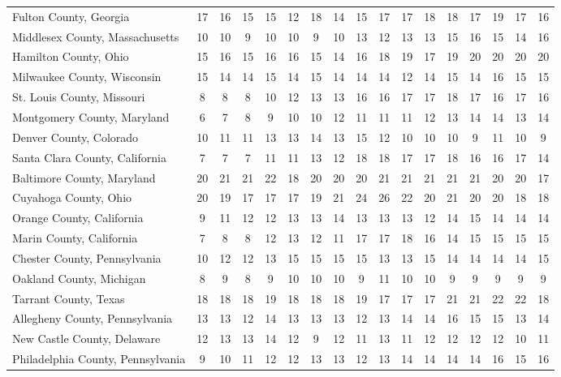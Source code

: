 \begin{landscape}
\begin{longtable}{lcccccccccccccccc}
	Fulton County, Georgia & 17 & 16 & 15 & 15 & 12 & 18 & 14 & 15 & 17 & 17 & 18 & 18 & 17 & 19 & 17 & 16 \\
	Middlesex County, Massachusetts & 10 & 10 & 9 & 10 & 10 & 9 & 10 & 13 & 12 & 13 & 13 & 15 & 16 & 15 & 14 & 16 \\
	Hamilton County, Ohio & 15 & 16 & 15 & 16 & 16 & 15 & 14 & 16 & 18 & 19 & 17 & 19 & 20 & 20 & 20 & 20 \\
	Milwaukee County, Wisconsin & 15 & 14 & 14 & 15 & 14 & 15 & 14 & 14 & 14 & 12 & 14 & 15 & 14 & 16 & 15 & 15 \\
	St. Louis County, Missouri & 8 & 8 & 8 & 10 & 12 & 13 & 13 & 16 & 16 & 17 & 17 & 18 & 17 & 16 & 17 & 16 \\
	Montgomery County, Maryland & 6 & 7 & 8 & 9 & 10 & 10 & 12 & 11 & 11 & 11 & 12 & 13 & 14 & 14 & 13 & 14 \\
	Denver County, Colorado & 10 & 11 & 11 & 13 & 13 & 14 & 13 & 15 & 12 & 10 & 10 & 10 & 9 & 11 & 10 & 9 \\
	Santa Clara County, California & 7 & 7 & 7 & 11 & 11 & 13 & 12 & 18 & 18 & 17 & 17 & 18 & 16 & 16 & 17 & 14 \\
	Baltimore County, Maryland & 20 & 21 & 21 & 22 & 18 & 20 & 20 & 20 & 21 & 21 & 21 & 21 & 21 & 20 & 20 & 17 \\
	Cuyahoga County, Ohio & 20 & 19 & 17 & 17 & 17 & 19 & 21 & 24 & 26 & 22 & 20 & 21 & 20 & 20 & 18 & 18 \\
	Orange County, California & 9 & 11 & 12 & 12 & 13 & 13 & 14 & 13 & 13 & 13 & 12 & 14 & 15 & 14 & 14 & 14 \\
	Marin County, California & 7 & 8 & 8 & 12 & 13 & 12 & 11 & 17 & 17 & 18 & 16 & 14 & 15 & 15 & 15 & 15 \\
	Chester County, Pennsylvania & 10 & 12 & 12 & 13 & 15 & 15 & 15 & 15 & 13 & 13 & 15 & 14 & 14 & 14 & 14 & 15 \\
	Oakland County, Michigan & 8 & 9 & 8 & 9 & 10 & 10 & 10 & 9 & 11 & 10 & 10 & 9 & 9 & 9 & 9 & 9 \\
	Tarrant County, Texas & 18 & 18 & 18 & 19 & 18 & 18 & 18 & 19 & 17 & 17 & 17 & 21 & 21 & 22 & 22 & 18 \\
	Allegheny County, Pennsylvania & 13 & 13 & 12 & 14 & 13 & 13 & 13 & 12 & 13 & 14 & 14 & 16 & 15 & 15 & 13 & 14 \\
	New Castle County, Delaware & 12 & 13 & 13 & 14 & 12 & 9 & 12 & 11 & 13 & 11 & 12 & 12 & 12 & 12 & 10 & 11 \\
	Philadelphia County, Pennsylvania & 9 & 10 & 11 & 12 & 12 & 13 & 13 & 12 & 13 & 14 & 14 & 14 & 14 & 16 & 15 & 16 \\

\end{longtable}
\end{landscape}
